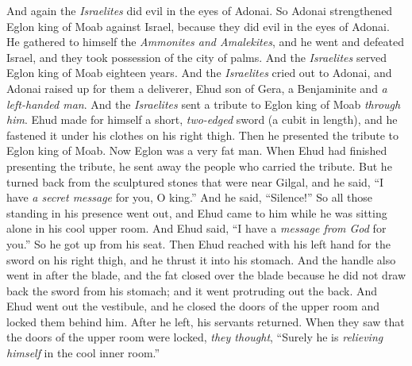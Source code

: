 \begin{biblechapter}
 And again the \textit{Israelites} did evil in the eyes of Adonai. So Adonai strengthened Eglon king of Moab against Israel, because they did evil in the eyes of Adonai.
\verse He gathered to himself the \textit{Ammonites and Amalekites}, and he went and defeated Israel, and they took possession of the city of palms.
\verse And the \textit{Israelites} served Eglon king of Moab eighteen years.
\verse And the \textit{Israelites} cried out to Adonai, and Adonai raised up for them a deliverer, Ehud son of Gera, a Benjaminite and \textit{a left-handed man}. And the \textit{Israelites} sent a tribute to Eglon king of Moab \textit{through him}.
\verse Ehud made for himself a short, \textit{two-edged} sword (a cubit in length), and he fastened it under his clothes on his right thigh.
\verse Then he presented the tribute to Eglon king of Moab. Now Eglon was a very fat man.
\verse When Ehud had finished presenting the tribute, he sent away the people who carried the tribute.
\verse But he turned back from the sculptured stones that were near Gilgal, and he said, “I have \textit{a secret message} for you, O king.” And he said, “Silence!” So all those standing in his presence went out,
\verse and Ehud came to him while he was sitting alone in his cool upper room. And Ehud said, “I have a \textit{message from God} for you.” So he got up from his seat.
\verse Then Ehud reached with his left hand for the sword on his right thigh, and he thrust it into his stomach.
\verse And the handle also went in after the blade, and the fat closed over the blade because he did not draw back the sword from his stomach; and it went protruding out the back.
\verse And Ehud went out the vestibule, and he closed the doors of the upper room and locked them behind him.
\verse After he left, his servants returned. When they saw that the doors of the upper room were locked, \textit{they thought}, “Surely he is \textit{relieving himself} in the cool inner room.”

\end{biblechapter}
